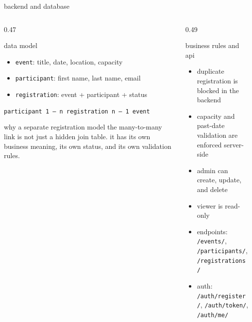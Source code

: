 \documentclass[aspectratio=169,11pt]{beamer}
\begin{document}
\begin{frame}{backend and database}
  \footnotesize
  \begin{columns}[T]
    \begin{column}{0.47\textwidth}
      \begin{block}{data model}
        \begin{itemize}
          \item \texttt{event}: title, date, location, capacity
          \item \texttt{participant}: first name, last name, email
          \item \texttt{registration}: event + participant + status
        \end{itemize}
        \vspace{0.35em}
        \centering
        \texttt{participant 1 --- n registration n --- 1 event}
      \end{block}

      \begin{alertblock}{why a separate registration model}
        the many-to-many link is not just a hidden join table. it has its own business meaning,
        its own status, and its own validation rules.
      \end{alertblock}
    \end{column}
    \begin{column}{0.49\textwidth}
      \begin{exampleblock}{business rules and api}
        \begin{itemize}
          \item duplicate registration is blocked in the backend
          \item capacity and past-date validation are enforced server-side
          \item admin can create, update, and delete
          \item viewer is read-only
          \item endpoints: \texttt{/events/}, \texttt{/participants/}, \texttt{/registrations/}
          \item auth: \texttt{/auth/register/}, \texttt{/auth/token/}, \texttt{/auth/me/}
        \end{itemize}
      \end{exampleblock}
    \end{column}
  \end{columns}
\end{frame}
\end{document}
